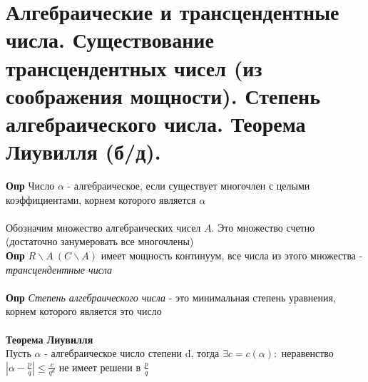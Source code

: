 \section{Алгебраические и трансцендентные числа. Существование трансцендентных чисел (из соображения мощности). Степень алгебраического числа. Теорема Лиувилля (б/д).}
\textbf{Опр} Число $\alpha$ - алгебраическое, если существует многочлен с целыми коэффициентами, корнем которого является $\alpha$
\\
\\
Обозначим множество алгебраических чисел $A$. Это множество счетно (достаточно занумеровать все многочлены)
\\
\textbf{Опр} $R \backslash A \ (C \backslash A) $ имеет мощность континуум, все числа из этого множества - \textit{трансцендентные числа}
\\
\\
\textbf{Опр} \textit{Степень алгебраического числа} - это минимальная степень уравнения, корнем которого является это число
\\
\\
\textbf{Теорема Лиувилля}
\\ Пусть $\alpha$ -  алгебраическое число степени d, тогда $\exists c = c(\alpha):$ неравенство $|\alpha - \frac{p}{q}| \leq \frac{c}{q^d}$ не имеет решени в $\frac{p}{q}$


